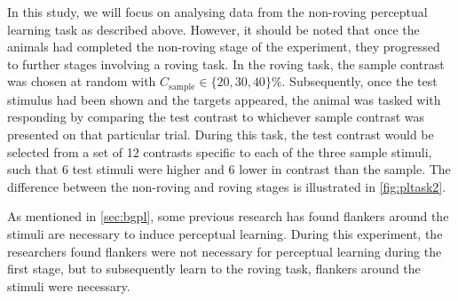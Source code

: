 
In this study, we will focus on analysing data from the non-roving perceptual learning task as described above.
However, it should be noted that once the animals had completed the non-roving stage of the experiment, they progressed to further stages involving a roving task.
In the roving task, the sample contrast was chosen at random with $C_\text{sample} \in \{20, 30, 40\}\%$.
Subsequently, once the test stimulus had been shown and the targets appeared, the animal was tasked with responding by comparing the test contrast to whichever sample contrast was presented on that particular trial.
During this task, the test contrast would be selected from a set of 12 contrasts specific to each of the three sample stimuli, such that 6 test stimuli were higher and 6 lower in contrast than the sample.
The difference between the non-roving and roving stages is illustrated in \autoref{fig:pltask2}.
%

As mentioned in \autoref{sec:bgpl}, some previous research has found flankers around the stimuli are necessary to induce perceptual learning.
During this experiment, the researchers found flankers were not necessary for perceptual learning during the first stage, but to subsequently learn to the roving task, flankers around the stimuli were necessary.

